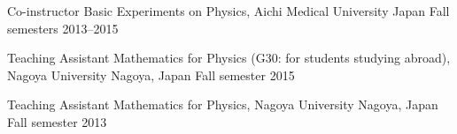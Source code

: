 \cventry
  {Co-instructor}
  {Basic Experiments on Physics, Aichi Medical University}
  {Japan}
  {Fall semesters 2013--2015}
  {}

\cventry
  {Teaching Assistant}
  {Mathematics for Physics (G30: for students studying abroad), Nagoya University}
  {Nagoya, Japan}
  {Fall semester 2015}
  {}

\cventry
  {Teaching Assistant}
  {Mathematics for Physics, Nagoya University}
  {Nagoya, Japan}
  {Fall semester 2013}
  {}
